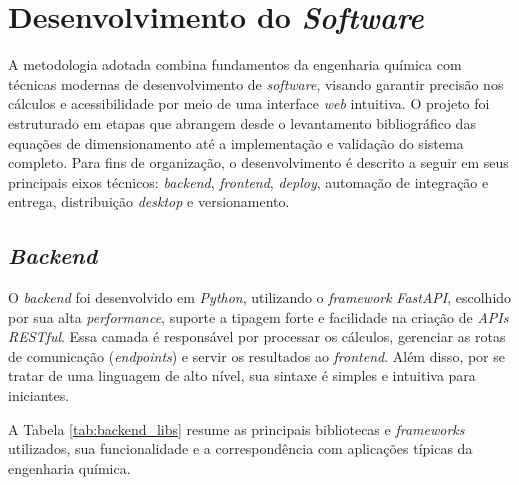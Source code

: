 \section{Desenvolvimento do \textit{Software}}

A metodologia adotada combina fundamentos da engenharia química com técnicas modernas de desenvolvimento de \textit{software}, visando garantir precisão nos cálculos e acessibilidade por meio de uma interface \textit{web} intuitiva. O projeto foi estruturado em etapas que abrangem desde o levantamento bibliográfico das equações de dimensionamento até a implementação e validação do sistema completo. Para fins de organização, o desenvolvimento é descrito a seguir em seus principais eixos técnicos: \textit{backend}, \textit{frontend}, \textit{deploy}, automação de integração e entrega, distribuição \textit{desktop} e versionamento.

\subsection{\textit{Backend}}

O \textit{backend} foi desenvolvido em \textit{Python}, utilizando o \textit{framework} \textit{FastAPI}, escolhido por sua alta \textit{performance}, suporte a tipagem forte e facilidade na criação de \textit{APIs RESTful}. Essa camada é responsável por processar os cálculos, gerenciar as rotas de comunicação (\textit{endpoints}) e servir os resultados ao \textit{frontend}. Além disso, por se tratar de uma linguagem de alto nível, sua sintaxe é simples e intuitiva para iniciantes.

A Tabela \ref{tab:backend_libs} resume as principais bibliotecas e \textit{frameworks} utilizados, sua funcionalidade e a correspondência com aplicações típicas da engenharia química.

